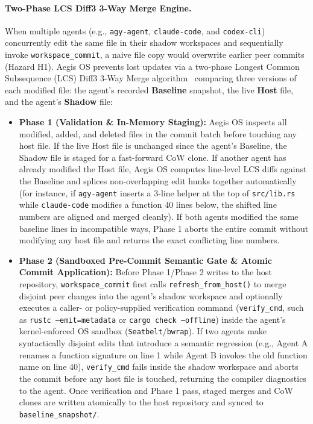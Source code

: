 \documentclass[acmsmall,screen,review]{acmart}
\begin{document}
\paragraph{Two-Phase LCS Diff3 3-Way Merge Engine.} When multiple agents (e.g., \texttt{agy-agent}, \texttt{claude-code}, and \texttt{codex-cli}) concurrently edit the same file in their shadow workspaces and sequentially invoke \texttt{workspace\_commit}, a naive file copy would overwrite earlier peer commits (Hazard H1). Aegis OS prevents lost updates via a two-phase Longest Common Subsequence (LCS) Diff3 3-Way Merge algorithm~\cite{khanna2007formal} comparing three versions of each modified file: the agent's recorded \textbf{Baseline} snapshot, the live \textbf{Host} file, and the agent's \textbf{Shadow} file:
\begin{itemize}
    \item \textbf{Phase 1 (Validation \& In-Memory Staging):} Aegis OS inspects all modified, added, and deleted files in the commit batch before touching any host file. If the live Host file is unchanged since the agent's Baseline, the Shadow file is staged for a fast-forward CoW clone. If another agent has already modified the Host file, Aegis OS computes line-level LCS diffs against the Baseline and splices non-overlapping edit hunks together automatically (for instance, if \texttt{agy-agent} inserts a 3-line helper at the top of \texttt{src/lib.rs} while \texttt{claude-code} modifies a function 40 lines below, the shifted line numbers are aligned and merged cleanly). If both agents modified the same baseline lines in incompatible ways, Phase 1 aborts the entire commit without modifying any host file and returns the exact conflicting line numbers.
    \item \textbf{Phase 2 (Sandboxed Pre-Commit Semantic Gate \& Atomic Commit Application):} Before Phase 1/Phase 2 writes to the host repository, \texttt{workspace\_commit} first calls \texttt{refresh\_from\_host()} to merge disjoint peer changes into the agent's shadow workspace and optionally executes a caller- or policy-supplied verification command (\texttt{verify\_cmd}, such as \texttt{rustc --emit=metadata} or \texttt{cargo check --offline}) inside the agent's kernel-enforced OS sandbox (\texttt{Seatbelt}/\texttt{bwrap}). If two agents make syntactically disjoint edits that introduce a semantic regression (e.g., Agent A renames a function signature on line 1 while Agent B invokes the old function name on line 40), \texttt{verify\_cmd} fails inside the shadow workspace and aborts the commit before any host file is touched, returning the compiler diagnostics to the agent. Once verification and Phase 1 pass, staged merges and CoW clones are written atomically to the host repository and synced to \texttt{baseline\_snapshot/}.
\end{itemize}
\end{document}
